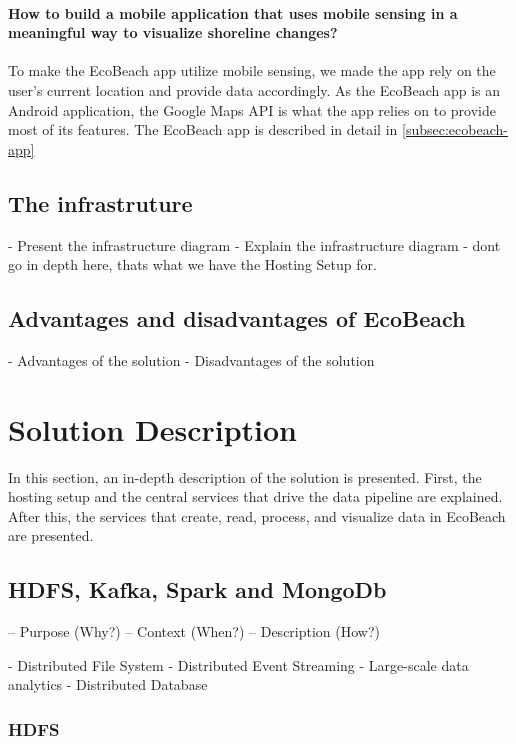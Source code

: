 \paragraph{How to build a mobile application that uses mobile sensing in a meaningful way to visualize shoreline changes?} To make the EcoBeach app utilize mobile sensing, we made the app rely on the user's current location and provide data accordingly. As the EcoBeach app is an Android application, the Google Maps API is what the app relies on to provide most of its features. The EcoBeach app is described in detail in \autoref{subsec:ecobeach-app}

\subsection{The infrastruture}\label{subsec:the-infrastructure}
- Present the infrastructure diagram
- Explain the infrastructure diagram
- dont go in depth here, thats what we have the Hosting Setup for.

\subsection{Advantages and disadvantages of EcoBeach}
- Advantages of the solution
- Disadvantages of the solution

\section{Solution Description}

In this section, an in-depth description of the solution is presented. First, the hosting setup and the central services that drive the data pipeline are explained. After this, the services that create, read, process, and visualize data in EcoBeach are presented.

\subsection{HDFS, Kafka, Spark and MongoDb} \label{subsec:the-stack}

– Purpose (Why?)
– Context (When?)
– Description (How?)

- Distributed File System
- Distributed Event Streaming
- Large-scale data analytics
- Distributed Database

\subsubsection{HDFS}

